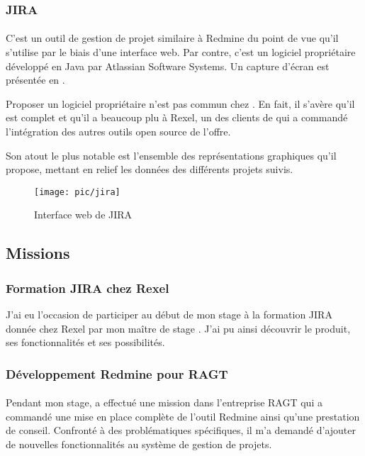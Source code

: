 \subsubsection{JIRA}

\paragraph{}
C'est un outil de gestion de projet similaire à Redmine du point de vue qu'il s'utilise par le biais d'une interface web.
Par contre, c'est un logiciel propriétaire développé en Java par Atlassian Software Systems.
Un capture d'écran est présentée en .

Proposer un logiciel propriétaire n'est pas commun chez \asmile.
En fait, il s'avère qu'il est complet et qu'il a beaucoup plu à Rexel, un des clients de \asmile{} qui a commandé l'intégration des autres outils open source de l'offre.

Son atout le plus notable est l'ensemble des représentations graphiques qu'il propose, mettant en relief les données des différents projets suivis.

\begin{figure}
	\centering
	\texttt{[image: pic/jira]}
	\caption{Interface web de JIRA}
	\label{figure:pic:jira}
\end{figure}



\subsection{Missions}

\subsubsection{Formation JIRA chez Rexel}

J'ai eu l'occasion de participer au début de mon stage à la formation JIRA donnée chez Rexel par mon maître de stage \agulet.
J'ai pu ainsi découvrir le produit, ses fonctionnalités et ses possibilités.



\subsubsection{Développement Redmine pour RAGT}

\paragraph{}
Pendant mon stage, \agulet{} a effectué une mission dans l'entreprise RAGT qui a commandé une mise en place complète de l'outil Redmine ainsi qu'une prestation de conseil.
Confronté à des problématiques spécifiques, il m'a demandé d'ajouter de nouvelles fonctionnalités au système de gestion de projets.

